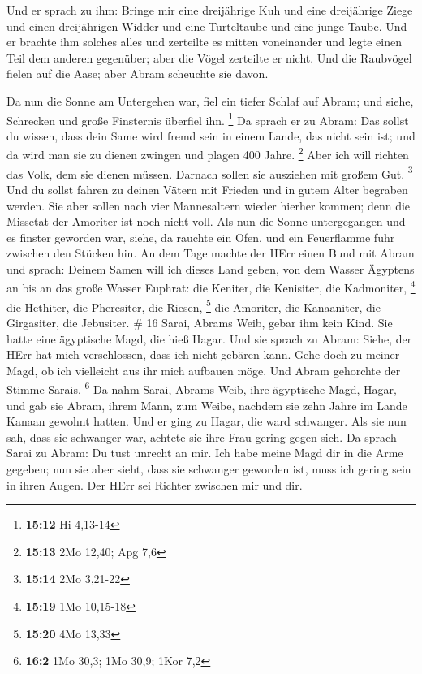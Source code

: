  Und er sprach zu ihm: Bringe mir eine dreijährige Kuh und
eine dreijährige Ziege und einen dreijährigen Widder und eine
Turteltaube und eine junge Taube.  Und er brachte ihm
solches alles und zerteilte es mitten voneinander und legte einen Teil
dem anderen gegenüber; aber die Vögel zerteilte er nicht. 
Und die Raubvögel fielen auf die Aase; aber Abram scheuchte sie davon.

 Da nun die Sonne am Untergehen war, fiel ein tiefer Schlaf
auf Abram; und siehe, Schrecken und große Finsternis überfiel ihn.
\footnote{\textbf{15:12} Hi 4,13-14}  Da sprach er zu
Abram: Das sollst du wissen, dass dein Same wird fremd sein in einem
Lande, das nicht sein ist; und da wird man sie zu dienen zwingen und
plagen 400 Jahre. \footnote{\textbf{15:13} 2Mo 12,40; Apg 7,6}
 Aber ich will richten das Volk, dem sie dienen müssen.
Darnach sollen sie ausziehen mit großem Gut. \footnote{\textbf{15:14}
  2Mo 3,21-22}  Und du sollst fahren zu deinen Vätern mit
Frieden und in gutem Alter begraben werden.  Sie aber
sollen nach vier Mannesaltern wieder hierher kommen; denn die Missetat
der Amoriter ist noch nicht voll.  Als nun die Sonne
untergegangen und es finster geworden war, siehe, da rauchte ein Ofen,
und ein Feuerflamme fuhr zwischen den Stücken hin.  An dem
Tage machte der HErr einen Bund mit Abram und sprach: Deinem Samen will
ich dieses Land geben, von dem Wasser Ägyptens an bis an das große
Wasser Euphrat:  die Keniter, die Kenisiter, die
Kadmoniter, \footnote{\textbf{15:19} 1Mo 10,15-18}  die
Hethiter, die Pheresiter, die Riesen, \footnote{\textbf{15:20} 4Mo 13,33}
 die Amoriter, die Kanaaniter, die Girgasiter, die
Jebusiter. \# 16  Sarai, Abrams Weib, gebar ihm kein Kind.
Sie hatte eine ägyptische Magd, die hieß Hagar.  Und sie
sprach zu Abram: Siehe, der HErr hat mich verschlossen, dass ich nicht
gebären kann. Gehe doch zu meiner Magd, ob ich vielleicht aus ihr mich
aufbauen möge. Und Abram gehorchte der Stimme Sarais. \footnote{\textbf{16:2}
  1Mo 30,3; 1Mo 30,9; 1Kor 7,2}  Da nahm Sarai, Abrams Weib,
ihre ägyptische Magd, Hagar, und gab sie Abram, ihrem Mann, zum Weibe,
nachdem sie zehn Jahre im Lande Kanaan gewohnt hatten.  Und
er ging zu Hagar, die ward schwanger. Als sie nun sah, dass sie
schwanger war, achtete sie ihre Frau gering gegen sich.  Da
sprach Sarai zu Abram: Du tust unrecht an mir. Ich habe meine Magd dir
in die Arme gegeben; nun sie aber sieht, dass sie schwanger geworden
ist, muss ich gering sein in ihren Augen. Der HErr sei Richter zwischen
mir und dir.

